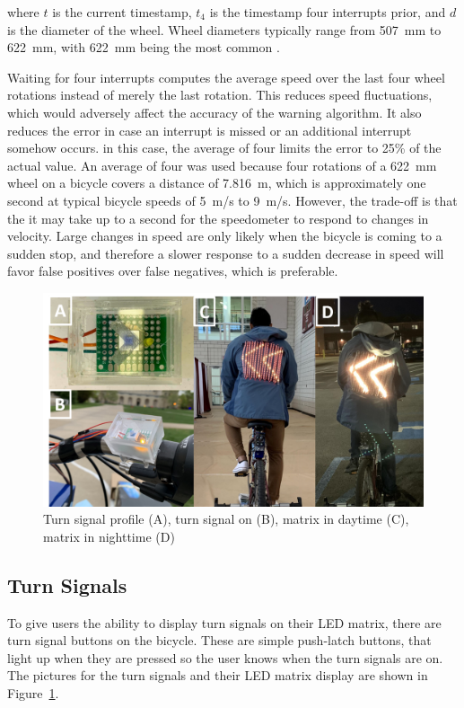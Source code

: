 \documentclass[journal]{IEEEtran}
\begin{document}
where $t$ is the current timestamp, $t_{4}$ is the timestamp four interrupts prior, and $d$ is the diameter of the wheel. Wheel diameters typically range from \SI{507}{\milli\m} to \SI{622}{\milli\m}, with \SI{622}{\milli\m} being the most common \cite{bike_wheel_size}.

Waiting for four interrupts computes the average speed over the last four wheel rotations instead of merely the last rotation. This reduces speed fluctuations, which would adversely affect the accuracy of the warning algorithm. It also reduces the error in case an interrupt is missed or an additional interrupt somehow occurs. in this case, the average of four limits the error to 25\% of the actual value. An average of four was used because four rotations of a \SI{622}{\milli\meter} wheel on a bicycle covers a distance of \SI{7.816}{\m}, which is approximately one second at typical bicycle speeds of \SI{5}{\meter/\s} to \SI{9}{\meter/\s}. However, the trade-off is that the it may take up to a second for the speedometer to respond to changes in velocity. Large changes in speed are only likely when the bicycle is coming to a sudden stop, and therefore a slower response to a sudden decrease in speed will favor false positives over false negatives, which is preferable.

\begin{figure}
    \centering
    \includegraphics[width=\columnwidth]{images/turn_signals.png}
    \caption{Turn signal profile (A), turn signal on (B), matrix in daytime (C), matrix in nighttime (D)}
    \label{fig:turn_sig}
\end{figure}

\subsection{Turn Signals}
To give users the ability to display turn signals on their LED matrix, there are turn signal buttons on the bicycle. These are simple push-latch buttons, that light up when they are pressed so the user knows when the turn signals are on.
The pictures for the turn signals and their LED matrix display are shown in Figure~\ref{fig:turn_sig}.
\end{document}
